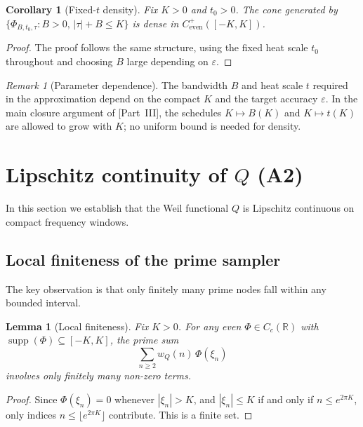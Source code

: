 \documentclass[11pt,a4paper]{article}
\newtheorem{lemma}[theorem]{Lemma}
\newtheorem{corollary}[theorem]{Corollary}
\theoremstyle{definition}
\theoremstyle{remark}
\newtheorem{remark}[theorem]{Remark}
\newcommand{\R}{\mathbb{R}}
\DeclareMathOperator{\supp}{supp}
\begin{document}
\begin{corollary}[Fixed-$t$ density]\label{cor:fixed-t}
Fix $K > 0$ and $t_0 > 0$. The cone generated by $\{\Phi_{B,t_0,\tau} : B > 0,\, |\tau| + B \leq K\}$ is dense in $C^+_{\mathrm{even}}([-K,K])$.
\end{corollary}

\begin{proof}
The proof follows the same structure, using the fixed heat scale $t_0$ throughout and choosing $B$ large depending on $\varepsilon$.
\end{proof}

\begin{remark}[Parameter dependence]\label{rem:params}
The bandwidth $B$ and heat scale $t$ required in the approximation depend on the compact $K$ and the target accuracy $\varepsilon$. In the main closure argument of [Part~III], the schedules $K \mapsto B(K)$ and $K \mapsto t(K)$ are allowed to grow with $K$; no uniform bound is needed for density.
\end{remark}

\section{Lipschitz continuity of $Q$ (A2)}
\label{sec:A2}

In this section we establish that the Weil functional $Q$ is Lipschitz continuous on compact frequency windows.

\subsection{Local finiteness of the prime sampler}

The key observation is that only finitely many prime nodes fall within any bounded interval.

\begin{lemma}[Local finiteness]\label{lem:local-finite}
Fix $K > 0$. For any even $\Phi \in C_c(\R)$ with $\supp(\Phi) \subseteq [-K, K]$, the prime sum
\begin{equation}\label{eq:prime-sum}
  \sum_{n \geq 2} w_Q(n)\, \Phi(\xi_n)
\end{equation}
involves only finitely many non-zero terms.
\end{lemma}

\begin{proof}
Since $\Phi(\xi_n) = 0$ whenever $|\xi_n| > K$, and $|\xi_n| \leq K$ if and only if $n \leq e^{2\pi K}$, only indices $n \leq \lfloor e^{2\pi K} \rfloor$ contribute. This is a finite set.
\end{proof}
\end{document}

